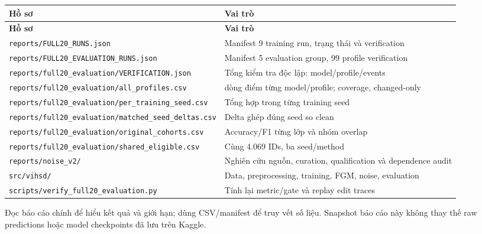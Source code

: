 \documentclass[11pt,a4paper]{article}
\newlength{\reporttablewidth}
\begin{document}
\begingroup
\small
\setlength{\tabcolsep}{4pt}
\setlength{\reporttablewidth}{\dimexpr\linewidth-2\tabcolsep\relax}
\renewcommand{\arraystretch}{1.15}
\begin{longtable}{@{}>{\raggedright\arraybackslash}p{0.54000\reporttablewidth}>{\raggedright\arraybackslash}p{0.46000\reporttablewidth}@{}}
\toprule
\textbf{Hồ sơ} & \textbf{Vai trò} \\
\midrule
\endfirsthead
\toprule
\textbf{Hồ sơ} & \textbf{Vai trò} \\
\midrule
\endhead
\bottomrule
\endlastfoot
\nolinkurl{reports/FULL20_RUNS.json} & Manifest 9 training run, trạng thái và verification \\
\nolinkurl{reports/FULL20_EVALUATION_RUNS.json} & Manifest 5 evaluation group, 99 profile verification \\
\nolinkurl{reports/full20_evaluation/VERIFICATION.json} & Tổng kiểm tra độc lập: model/profile/events \\
\nolinkurl{reports/full20_evaluation/all_profiles.csv} & 99 dòng điểm từng model/profile; coverage, changed-only \\
\nolinkurl{reports/full20_evaluation/per_training_seed.csv} & Tổng hợp trong từng training seed \\
\nolinkurl{reports/full20_evaluation/matched_seed_deltas.csv} & Delta ghép đúng seed so clean \\
\nolinkurl{reports/full20_evaluation/original_cohorts.csv} & Accuracy/F1 từng lớp và nhóm overlap \\
\nolinkurl{reports/full20_evaluation/shared_eligible.csv} & Cùng 4.069 IDs, ba seed/method \\
\nolinkurl{reports/noise_v2/} & Nghiên cứu nguồn, curation, qualification và dependence audit \\
\nolinkurl{src/vihsd/} & Data, preprocessing, training, FGM, noise, evaluation \\
\nolinkurl{scripts/verify_full20_evaluation.py} & Tính lại metric/gate và replay edit traces \\
\end{longtable}
\endgroup

Đọc báo cáo chính để hiểu kết quả và giới hạn; dùng CSV/manifest để truy vết số liệu. Snapshot báo cáo này không thay thế raw predictions hoặc model checkpoints đã lưu trên Kaggle.
\end{document}
